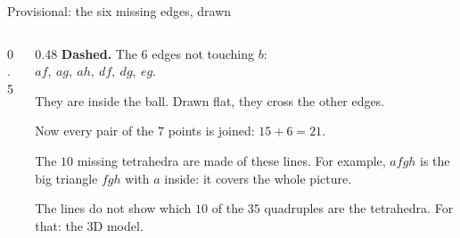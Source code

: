 \begin{frame}{Provisional: the six missing edges, drawn}
\begin{columns}[c]
\begin{column}{0.5\textwidth}\centering
{}
\end{column}
\begin{column}{0.48\textwidth}
\textbf{Dashed.} The \(6\) edges not touching \(b\):\\ \(af,\ ag,\ ah,\ df,\ dg,\ eg\).
\par\medskip
They are inside the ball. Drawn flat, they cross the other edges.
\par\medskip
Now every pair of the \(7\) points is joined: \(15+6=21\).
\par\medskip
The \(10\) missing tetrahedra are made of these lines. For example, \(afgh\) is the big triangle \(fgh\) with \(a\) inside: it covers the whole picture.
\par\medskip
The lines do not show which \(10\) of the \(35\) quadruples are the tetrahedra. For that: the 3D model.
\end{column}
\end{columns}
\end{frame}

